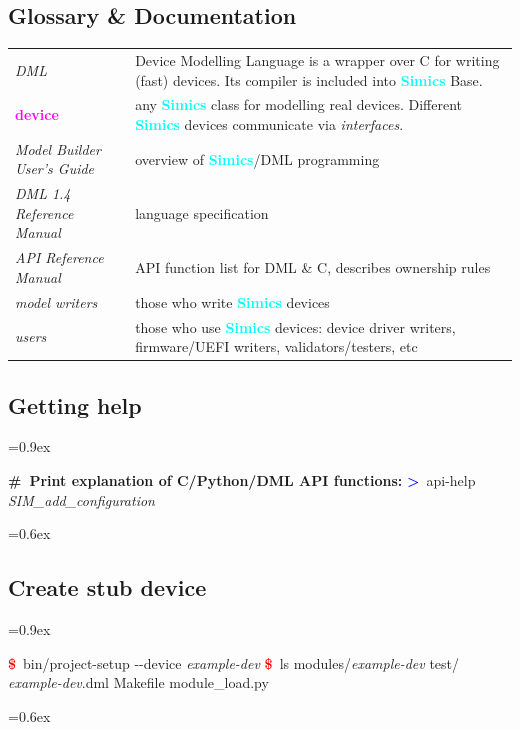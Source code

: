 \documentclass[8pt]{extarticle}
\newenvironment{code}[1][]{%
\begin{prebox}[#1]\obeylines%
\fontdimen2\font=0.9ex%
}{%
\end{prebox}%
\fontdimen2\font=0.6ex%
}
\newcommand{\prompt}{\textcolor{red}{\textbf{\$}\ }}
\newcommand{\sprompt}{\textcolor{blue}{\textbf{>}\ }}
\newcommand{\kw}[1]{\textcolor{magenta}{\textbf{#1}}}
\newcommand{\cmtcommon}[1]{\textcolor{Sepia}{\textbf{#1}}}
\newcommand{\cmt}[1]{\cmtcommon{\#\ #1}}
\newcommand{\p}[1]{\textit{\large#1}}
\newcommand{\Simics}{\textcolor{cyan}{\textbf{Simics}}}
\newlength{\MyLen}
\begin{document}
\begin{multicols*}{3}
\subsection{Glossary \& Documentation}
    \noindent\begin{tabular}{p{\the\MyLen}p{\linewidth-\the\MyLen-0.8cm}}
        \textit{DML}         & Device Modelling Language is a
        wrapper over C for writing (fast) devices.
        Its compiler is included into \Simics{} Base.
        \\
        \kw{device}          & any \Simics{} class for modelling real
        devices. Different \Simics{} devices communicate via \textit{interfaces}.
        \\
        \textit{Model Builder User’s Guide} & overview of \Simics{}/DML
        programming \\
        \textit{DML 1.4 Reference Manual} & language specification \\
        \textit{API Reference Manual} & API function list for DML \& C,
        describes ownership rules\\
        \textit{model writers} & those who write \Simics{} devices\\
        \textit{users} & those who use \Simics{} devices:
                         device driver writers, firmware/UEFI writers,
                         validators/testers, etc
    \end{tabular}

\subsection{Getting help}
\begin{code}
    \cmt{Print explanation of C/Python/DML API functions:}
    \sprompt api-help \p{SIM_add_configuration}
\end{code}

\subsection{Create stub device}

\begin{code}
    \prompt bin/project-setup -{}-device \p{example-dev}
    \prompt ls modules/\p{example-dev}
    test/  \p{example-dev}.dml  Makefile  module_load.py
\end{code}


\end{multicols*}
\end{document}
